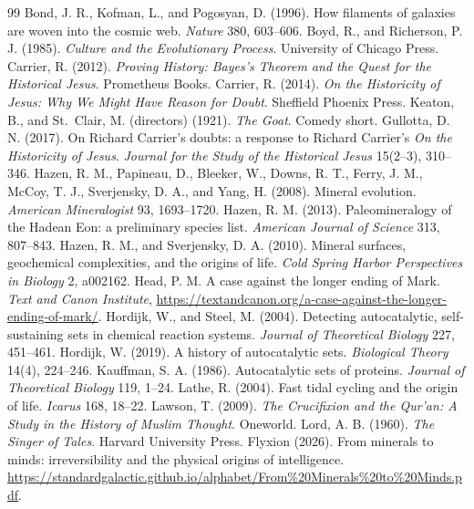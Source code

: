 \documentclass[11pt]{article}
\begin{document}
\begin{thebibliography}{99}
 Bond, J. R., Kofman, L., and Pogosyan, D. (1996). How filaments of galaxies are woven into the cosmic web. \emph{Nature} 380, 603--606.
 Boyd, R., and Richerson, P. J. (1985). \emph{Culture and the Evolutionary Process}. University of Chicago Press.
 Carrier, R. (2012). \emph{Proving History: Bayes's Theorem and the Quest for the Historical Jesus}. Prometheus Books.
 Carrier, R. (2014). \emph{On the Historicity of Jesus: Why We Might Have Reason for Doubt}. Sheffield Phoenix Press.
 Keaton, B., and St.\ Clair, M. (directors) (1921). \emph{The Goat}. Comedy short.
 Gullotta, D. N. (2017). On Richard Carrier's doubts: a response to Richard Carrier's \emph{On the Historicity of Jesus}. \emph{Journal for the Study of the Historical Jesus} 15(2--3), 310--346.
 Hazen, R. M., Papineau, D., Bleeker, W., Downs, R. T., Ferry, J. M., McCoy, T. J., Sverjensky, D. A., and Yang, H. (2008). Mineral evolution. \emph{American Mineralogist} 93, 1693--1720.
 Hazen, R. M. (2013). Paleomineralogy of the Hadean Eon: a preliminary species list. \emph{American Journal of Science} 313, 807--843.
 Hazen, R. M., and Sverjensky, D. A. (2010). Mineral surfaces, geochemical complexities, and the origins of life. \emph{Cold Spring Harbor Perspectives in Biology} 2, a002162.
 Head, P. M. A case against the longer ending of Mark. \emph{Text and Canon Institute}, \url{https://textandcanon.org/a-case-against-the-longer-ending-of-mark/}.
 Hordijk, W., and Steel, M. (2004). Detecting autocatalytic, self-sustaining sets in chemical reaction systems. \emph{Journal of Theoretical Biology} 227, 451--461.
 Hordijk, W. (2019). A history of autocatalytic sets. \emph{Biological Theory} 14(4), 224--246.
 Kauffman, S. A. (1986). Autocatalytic sets of proteins. \emph{Journal of Theoretical Biology} 119, 1--24.
 Lathe, R. (2004). Fast tidal cycling and the origin of life. \emph{Icarus} 168, 18--22.
 Lawson, T. (2009). \emph{The Crucifixion and the Qur'an: A Study in the History of Muslim Thought}. Oneworld.
 Lord, A. B. (1960). \emph{The Singer of Tales}. Harvard University Press.
 Flyxion (2026). From minerals to minds: irreversibility and the physical origins of intelligence. \url{https://standardgalactic.github.io/alphabet/From\%20Minerals\%20to\%20Minds.pdf}.

\end{thebibliography}
\end{document}

